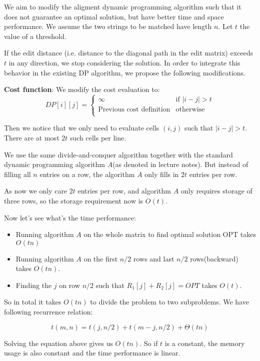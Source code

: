 
We aim to modify the aligment dynamic programming algorithm such that it does not guarantee an optimal solution, but have better time and space performance. We assume the two strings to be matched have length $n$. Let $t$ the value of a threshold.

If the edit distance (i.e. distance to the diagonal path in the edit matrix) exceeds $t$ in any direction, we stop considering the solution. In order to integrate this behavior in the existing DP algorithm, we propose the following modifications.

\textbf{Cost function}: We modify the cost evaluation to:
\[
  DP[i][j] = \left \{
    \begin{array}{ll}
      \infty & \text{if } |i - j| > t \\
      \text{Previous cost definition} & \text{otherwise} \\
    \end{array}
  \right.
\]

Then we notice that we only need to evaluate cells $(i, j)$ such that $|i - j| > t$. There are at most $2t$ such cells per line.

We use the same divide-and-conquer algorithm together with the standard dynamic programming algorithm $A$(as denoted in lecture notes). But instead of filling all $n$ entries on a row, the algorithm $A$ only fills in $2t$ entries per row.

As now we only care $2t$ entries per row, and algorithm $A$ only requires storage of three rows, so the storage requirement now is $O(t)$.

Now let's see what's the time performance:

\begin{itemize}
\item Running algorithm $A$ on the whole matrix to find optimal solution OPT takes $O(tn)$
\item Running algorithm $A$ on the first $n/2$ rows and last $n/2$ rows(backward) takes $O(tn)$.
\item Finding the $j$ on row $n/2$ such that $R_1[j] + R_2[j] = OPT$ takes $O(t)$.
\end{itemize}

So in total it takes $O(tn)$ to divide the problem to two subproblems. We have following recurrence relation:

\[
t(m,n) = t(j, n/2) + t(m-j,n/2) + \Theta(tn)
\]

Solving the equation above gives us $O(tn)$. So if $t$ is a constant, the memory usage is also constant and the time performance is linear.
